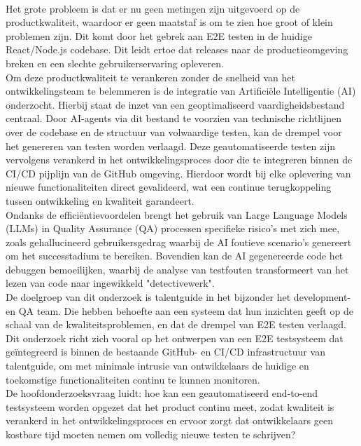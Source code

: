 \bigskip
\\
Het grote probleem is dat er nu geen metingen zijn uitgevoerd op de productkwaliteit, waardoor er geen maatstaf is om te zien hoe groot of klein problemen zijn. Dit komt door het gebrek aan E2E testen in de huidige React/Node.js codebase. Dit leidt ertoe dat releases naar de productieomgeving breken en een slechte gebruikerservaring opleveren.
\bigskip
\\
Om deze productkwaliteit te verankeren zonder de snelheid van het ontwikkelingsteam te belemmeren is de integratie van Artificiële Intelligentie (AI) onderzocht. Hierbij staat de inzet van een geoptimaliseerd vaardigheidsbestand centraal. Door AI-agents via dit bestand te voorzien van technische richtlijnen over de codebase en de structuur van volwaardige testen, kan de drempel voor het genereren van testen worden verlaagd. Deze geautomatiseerde testen zijn vervolgens verankerd in het ontwikkelingsproces door die te integreren binnen de CI/CD pijplijn van de GitHub omgeving. Hierdoor wordt bij elke oplevering van nieuwe functionaliteiten direct gevalideerd, wat een continue terugkoppeling tussen ontwikkeling en kwaliteit garandeert.
\bigskip
\\
Ondanks de efficiëntievoordelen brengt het gebruik van Large Language Models (LLMs) in Quality Assurance (QA) processen specifieke risico's met zich mee, zoals gehallucineerd gebruikersgedrag waarbij de AI foutieve scenario’s genereert om het successtadium te bereiken. Bovendien kan de AI gegenereerde code het debuggen bemoeilijken, waarbij de analyse van testfouten transformeert van het lezen van code naar ingewikkeld "detectivewerk".
\bigskip
\\
De doelgroep van dit onderzoek is talentguide in het bijzonder het development- en QA team. Die hebben behoefte aan een systeem dat hun inzichten geeft op de schaal van de kwaliteitsproblemen, en dat de drempel van E2E testen verlaagd. Dit onderzoek richt zich vooral op het ontwerpen van een E2E testsysteem dat geïntegreerd is binnen de bestaande GitHub- en CI/CD infrastructuur van talentguide, om met minimale intrusie van ontwikkelaars de huidige en toekomstige functionaliteiten continu te kunnen monitoren. 
\bigskip
\\
De hoofdonderzoeksvraag luidt: hoe kan een geautomatiseerd end-to-end testsysteem worden opgezet dat het product continu meet, zodat kwaliteit is verankerd in het ontwikkelingsproces en ervoor zorgt dat ontwikkelaars geen kostbare tijd moeten nemen om volledig nieuwe testen te schrijven?
\bigskip

